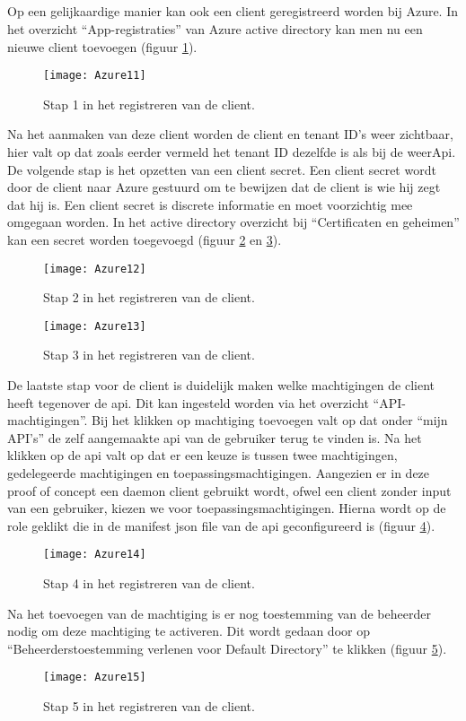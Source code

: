 \subsection{}
Op een gelijkaardige manier kan ook een client geregistreerd worden bij Azure. In het overzicht “App-registraties” van Azure active directory kan men nu een nieuwe client toevoegen (figuur \ref{fig:azure11}).
\begin{figure}[H]
	\centering
	\texttt{[image: Azure11]} 
	\caption[Azure11]{Stap 1 in het registreren van de client.}
	\label{fig:azure11}
\end{figure}
Na het aanmaken van deze client worden de client en tenant ID’s weer zichtbaar, hier valt op dat zoals eerder vermeld het tenant ID dezelfde is als bij de weerApi. De volgende stap is het opzetten van een client secret. Een client secret wordt door de client naar Azure gestuurd om te bewijzen dat de client is wie hij zegt dat hij is. Een client secret is discrete informatie en moet voorzichtig mee omgegaan worden. In het active directory overzicht bij “Certificaten en geheimen” kan een secret worden toegevoegd (figuur \ref{fig:azure12} en \ref{fig:azure13}). 
\begin{figure}[H]
	\centering
	\texttt{[image: Azure12]} 
	\caption[Azure12]{Stap 2 in het registreren van de client.}
	\label{fig:azure12}
\end{figure}
\begin{figure}[H]
	\centering
	\texttt{[image: Azure13]} 
	\caption[Azure13]{Stap 3 in het registreren van de client.}
	\label{fig:azure13}
\end{figure}
De laatste stap voor de client is duidelijk maken welke machtigingen de client heeft tegenover de api. Dit kan ingesteld worden via het overzicht “API-machtigingen”. Bij het klikken op machtiging toevoegen valt op dat onder “mijn API’s” de zelf aangemaakte api van de gebruiker terug te vinden is. Na het klikken op de api valt op dat er een keuze is tussen twee machtigingen, gedelegeerde machtigingen en toepassingsmachtigingen. Aangezien er in deze proof of concept een daemon client gebruikt wordt, ofwel een client zonder input van een gebruiker, kiezen we voor toepassingsmachtigingen. Hierna wordt op de role geklikt die in de manifest json file van de api geconfigureerd is (figuur \ref{fig:azure14}). 
\begin{figure}[H]
	\centering
	\texttt{[image: Azure14]} 
	\caption[Azure14]{Stap 4 in het registreren van de client.}
	\label{fig:azure14}
\end{figure}
Na het toevoegen van de machtiging is er nog toestemming van de beheerder nodig om deze machtiging te activeren. Dit wordt gedaan door op “Beheerderstoestemming verlenen voor Default Directory” te klikken (figuur \ref{fig:azure15}).
\begin{figure}[H]
	\centering
	\texttt{[image: Azure15]} 
	\caption[Azure15]{Stap 5 in het registreren van de client.}
	\label{fig:azure15}
\end{figure}
